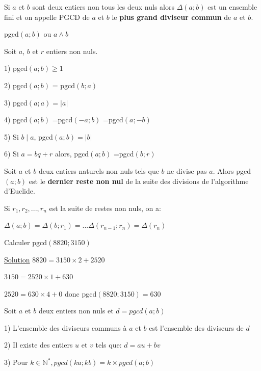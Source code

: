 \documentclass[french]{book}
\begin{document}
\begin{defn}

Si $a$ et $b$ sont deux entiers non tous les deux nuls alors $ \Delta\left( a;b\right)$ est un ensemble fini et on appelle PGCD de $a$ et $b$ le \textbf{plus grand diviseur commun} de $a$ et $b$.
\end{defn}

\begin{rem}
pgcd$(a;b)$ ou $a\wedge b$
\end{rem}

\begin{prop}
Soit $a$, $b$ et $r$ entiers non nuls.

1) pgcd$(a;b)\geq 1$

2) pgcd$(a;b)$ = pgcd$(b;a)$

3) pgcd$(a;a)=\vert a\vert$

4) pgcd$(a;b)$ =pgcd$(-a;b)$ =pgcd$(a;-b)$

5) Si $b\mid a$, pgcd$(a;b)=\vert b \vert$

6) Si $a=bq+r$  alors,  pgcd$(a;b)$ =pgcd$(b;r)$ 


\end{prop}

\begin{exemple}

Soit $a$ et $b$ deux entiers naturels non nuls tels que $b$ ne divise pas $a$. Alors pgcd$(a;b)$ est le \textbf{dernier reste non nul} de la suite des divisions de l'algorithme d'Euclide.

Si $r_{1},r_{2},...,r_{n}$ est la suite de restes non nuls, on a:

$ \Delta\left( a;b\right)= \Delta\left( b;r_{1}\right)=... \Delta\left( r_{n-1};r_{n}\right)= \Delta\left( r_{n}\right)$


\end{exemple}

\begin{exemple}

Calculer pgcd$(8820;3150)$

\underline{Solution}
$8820=3150\times 2+2520$

$3150=2520\times 1+630$

$2520=630\times 4+0$ 
donc pgcd$(8820;3150)=630$

\end{exemple}

\begin{prop}

Soit $a$ et $b$ deux entiers non nuls et $d= pgcd(a;b)$

1) L'ensemble des diviseurs communs à $a$ et $b$ est l'ensemble des diviseurs de $d$

2) Il existe des entiers $u$ et $v$ tels que: $d=au+bv$

3) Pour  $k \in\mathbb{N}^{*}, pgcd(ka;kb)=k\times pgcd(a;b)$

\end{prop}
\end{document}
